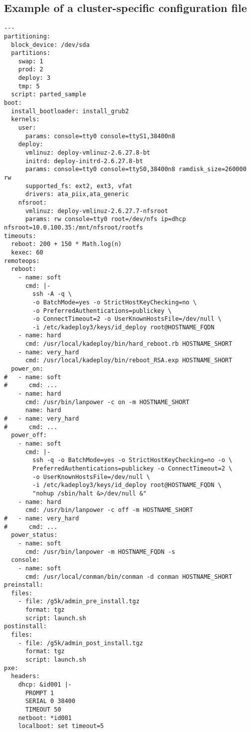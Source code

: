 \documentclass[a4wide,10pt,oneside]{book}
\begin{document}
\subsection{Example of a cluster-specific configuration file}
\begin{small}
\begin{verbatim}
---
partitioning:
  block_device: /dev/sda
  partitions:
    swap: 1
    prod: 2
    deploy: 3
    tmp: 5
  script: parted_sample
boot:
  install_bootloader: install_grub2
  kernels:
    user:
      params: console=tty0 console=ttyS1,38400n8
    deploy:
      vmlinuz: deploy-vmlinuz-2.6.27.8-bt
      initrd: deploy-initrd-2.6.27.8-bt
      params: console=tty0 console=ttyS0,38400n8 ramdisk_size=260000 rw
      supported_fs: ext2, ext3, vfat
      drivers: ata_piix,ata_generic
    nfsroot:
      vmlinuz: deploy-vmlinuz-2.6.27.7-nfsroot
      params: rw console=tty0 root=/dev/nfs ip=dhcp nfsroot=10.0.100.35:/mnt/nfsroot/rootfs
timeouts: 
  reboot: 200 + 150 * Math.log(n)
  kexec: 60
remoteops: 
  reboot: 
    - name: soft
      cmd: |-
        ssh -A -q \
        -o BatchMode=yes -o StrictHostKeyChecking=no \
        -o PreferredAuthentications=publickey \
        -o ConnectTimeout=2 -o UserKnownHostsFile=/dev/null \
        -i /etc/kadeploy3/keys/id_deploy root@HOSTNAME_FQDN
    - name: hard
      cmd: /usr/local/kadeploy/bin/hard_reboot.rb HOSTNAME_SHORT
    - name: very_hard
      cmd: /usr/local/kadeploy/bin/reboot_RSA.exp HOSTNAME_SHORT
  power_on:
#   - name: soft
#      cmd: ...
    - name: hard
      cmd: /usr/bin/lanpower -c on -m HOSTNAME_SHORT
      name: hard
#   - name: very_hard
#      cmd: ...
  power_off: 
    - name: soft
      cmd: |-
        ssh -q -o BatchMode=yes -o StrictHostKeyChecking=no -o \
        PreferredAuthentications=publickey -o ConnectTimeout=2 \
        -o UserKnownHostsFile=/dev/null \
        -i /etc/kadeploy3/keys/id_deploy root@HOSTNAME_FQDN \
        "nohup /sbin/halt &>/dev/null &"
    - name: hard
      cmd: /usr/bin/lanpower -c off -m HOSTNAME_SHORT
#   - name: very_hard
#      cmd: ...
  power_status: 
    - name: soft
      cmd: /usr/bin/lanpower -m HOSTNAME_FQDN -s
  console: 
    - name: soft
      cmd: /usr/local/conman/bin/conman -d conman HOSTNAME_SHORT
preinstall: 
  files:
    - file: /g5k/admin_pre_install.tgz
      format: tgz
      script: launch.sh
postinstall: 
  files:
    - file: /g5k/admin_post_install.tgz
      format: tgz
      script: launch.sh
pxe: 
  headers:
    dhcp: &id001 |-
      PROMPT 1
      SERIAL 0 38400
      TIMEOUT 50
    netboot: *id001
    localboot: set timeout=5

\end{verbatim}
\end{small}
\end{document}

